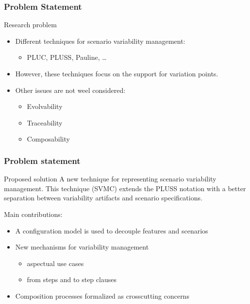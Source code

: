 \documentclass{beamer}
\begin{document}
\begin{frame}
\frametitle{Problem Statement}
\begin{block}{Research problem}
\begin{itemize}
\item Different techniques for scenario variability management:
\begin{itemize} 
  \item  PLUC, PLUSS, Pauline, \ldots
\end{itemize} 

\item However, these techniques focus on the support for variation points.

\item Other issues are not weel considered:  
\begin{itemize}
  \item Evolvability 
  \item Traceability 
  \item Composability
\end{itemize}

\end{itemize}
\end{block}

\end{frame}

\begin{frame}
\frametitle{Problem statement}
\begin{block}{Proposed solution}
A new technique for representing scenario variability management. This
technique (SVMC) extends the PLUSS notation with a better separation between 
variability artifacts and scenario specifications.
\end{block}

Main contributions: 

\begin{itemize}
  \item A configuration model is used to decouple features and scenarios
  \item New mechanisms for variability management
	\begin{itemize}
      \item aspectual use cases
      \item from steps and to step clauses
    \end{itemize}   
  \item Composition processes formalized as crosscutting concerns
\end{itemize} 

\end{frame}
 
\end{document}
